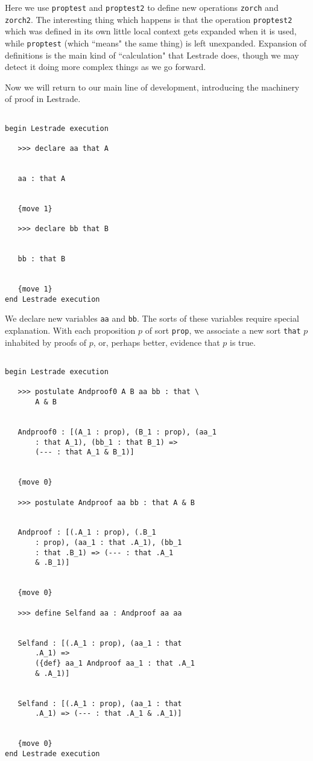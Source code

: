 \documentclass[12pt]{article}
\begin{document}
Here we use {\tt proptest} and {\tt proptest2} to define new operations {\tt zorch} and {\tt zorch2}.  The interesting thing which happens is that the operation
{\tt proptest2} which was defined in its own little  local context gets expanded when it is used, while {\tt proptest} (which ``means" the same thing) is left unexpanded.  Expansion of definitions is the main kind of ``calculation" that Lestrade does, though we may detect it doing more complex things as we go forward.

Now we will return to our main line of development, introducing the machinery of proof in Lestrade.

\begin{verbatim}

begin Lestrade execution

   >>> declare aa that A


   aa : that A


   {move 1}

   >>> declare bb that B


   bb : that B


   {move 1}
end Lestrade execution
\end{verbatim}

We declare new variables {\tt aa}  and {\tt bb}.  The sorts of these variables require special explanation.  With each proposition $p$ of sort
{\tt prop}, we associate a new sort {\tt that} $p$ inhabited by proofs of $p$, or, perhaps better, evidence that $p$ is true.

\begin{verbatim}

begin Lestrade execution

   >>> postulate Andproof0 A B aa bb : that \
       A & B


   Andproof0 : [(A_1 : prop), (B_1 : prop), (aa_1 
       : that A_1), (bb_1 : that B_1) => 
       (--- : that A_1 & B_1)]


   {move 0}

   >>> postulate Andproof aa bb : that A & B


   Andproof : [(.A_1 : prop), (.B_1 
       : prop), (aa_1 : that .A_1), (bb_1 
       : that .B_1) => (--- : that .A_1 
       & .B_1)]


   {move 0}

   >>> define Selfand aa : Andproof aa aa


   Selfand : [(.A_1 : prop), (aa_1 : that 
       .A_1) => 
       ({def} aa_1 Andproof aa_1 : that .A_1 
       & .A_1)]


   Selfand : [(.A_1 : prop), (aa_1 : that 
       .A_1) => (--- : that .A_1 & .A_1)]


   {move 0}
end Lestrade execution
\end{verbatim}
\end{document}
